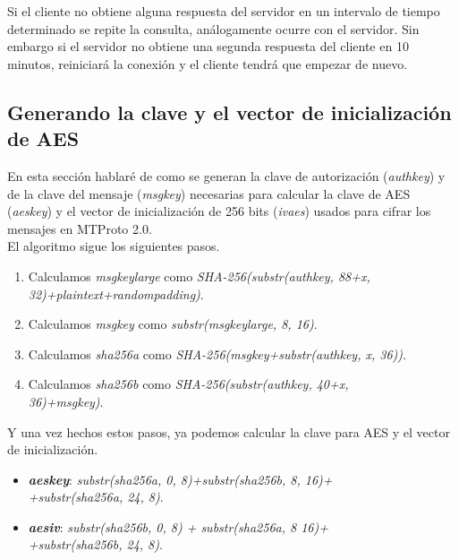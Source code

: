 Si el cliente no obtiene alguna respuesta del servidor en un intervalo de tiempo determinado se repite la consulta, análogamente ocurre con el servidor. Sin embargo si el servidor no obtiene una segunda respuesta del cliente en 10 minutos, reiniciará la conexión y el cliente tendrá que empezar de nuevo.

\subsection{Generando la clave y el vector de inicialización de AES}
En esta sección hablaré de como se generan la clave de autorización (\emph{auth\textunderscore key}) y de la clave del mensaje (\emph{msg\textunderscore key}) necesarias para calcular la clave de AES (\emph{aes\textunderscore key}) y el vector de inicialización de 256 bits (\emph{iv\textunderscore aes}) usados para cifrar los mensajes en MTProto 2.0.\\
El algoritmo sigue los siguientes pasos.
\begin{enumerate}
	\item Calculamos \emph{msg\textunderscore key\textunderscore large} como \emph{SHA-256(substr(auth\textunderscore key, 88+x, 32)+plaintext+random\textunderscore padding)}.
	\item Calculamos \emph{msg\textunderscore key} como \emph{substr(msg\textunderscore key\textunderscore large, 8, 16)}.
	\item Calculamos \emph{sha256\textunderscore a} como \emph{SHA-256(msg\textunderscore key+substr(auth\textunderscore key, x, 36))}.
	\item Calculamos \emph{sha256\textunderscore b} como \emph{SHA-256(substr(auth\textunderscore key, 40+x,\\ 36)+msg\textunderscore key)}.
\end{enumerate}
Y una vez hechos estos pasos, ya podemos calcular la clave para AES y el vector de inicialización.
\begin{itemize}
	\item \textbf{\emph{aes\textunderscore key}}: \emph{substr(sha256\textunderscore a, 0, 8)+substr(sha256\textunderscore b, 8, 16)+\\+substr(sha256\textunderscore a, 24, 8)}.
	\item \textbf{\emph{aes\textunderscore iv}}: \emph{substr(sha256\textunderscore b, 0, 8) + substr(sha256\textunderscore a, 8 16)+\\+substr(sha256\textunderscore b, 24, 8)}.
\end{itemize}
